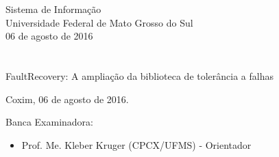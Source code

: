 \vskip 0.5cm
\begin{center}
Sistema de Informação\\
Universidade Federal de Mato Grosso do Sul\\
06 de agosto de 2016
\end{center}
		

\chapter*{}

\begin{center}

\begin{minipage}[t]{10cm}
	\begin{center}
		\vspace{-2cm}
		{{\Large FaultRecovery: A ampliação da biblioteca de tolerância a falhas}}  
	\end{center}
\end{minipage}

\end{center}


\begin{flushright}
	\vspace{12cm}
	Coxim, 06 de agosto de 2016.
	
\end{flushright}

\vspace{2cm}
Banca Examinadora:

\begin{itemize}
	\item Prof. Me. Kleber Kruger (CPCX/UFMS) - Orientador
	
\end{itemize}
